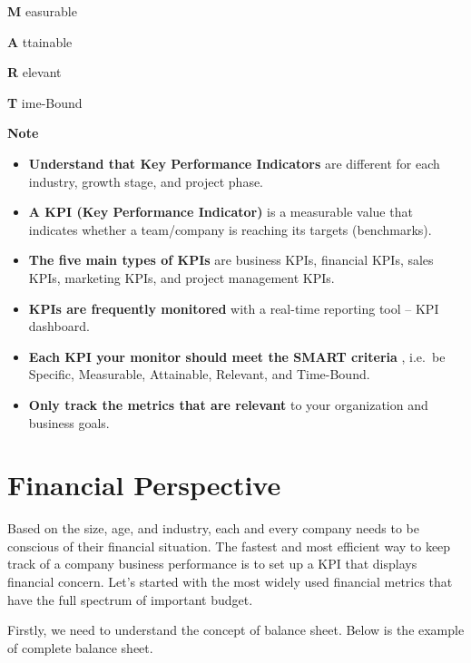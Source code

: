 \documentclass[]{book}
\providecommand{\tightlist}{%
  \setlength{\itemsep}{0pt}\setlength{\parskip}{0pt}}
\begin{document}
\textbf{M }easurable

\textbf{A }ttainable

\textbf{R }elevant

\textbf{T }ime-Bound

\textbf{Note }

\begin{itemize}
\tightlist
\item
  \textbf{Understand that Key Performance Indicators } are different for
  each industry, growth stage, and project phase.
\item
  \textbf{A KPI (Key Performance Indicator) } is a measurable value that
  indicates whether a team/company is reaching its targets (benchmarks).
\item
  \textbf{The five main types of KPIs } are business KPIs, financial
  KPIs, sales KPIs, marketing KPIs, and project management KPIs.
\item
  \textbf{KPIs are frequently monitored } with a real-time reporting
  tool -- KPI dashboard.
\item
  \textbf{Each KPI your monitor should meet the SMART criteria },
  i.e.~be Specific, Measurable, Attainable, Relevant, and Time-Bound.
\item
  \textbf{Only track the metrics that are relevant} to your organization
  and business goals.
\end{itemize}

\section{Financial Perspective}\label{financial-perspective}

Based on the size, age, and industry, each and every company needs to be
conscious of their financial situation. The fastest and most efficient
way to keep track of a company business performance is to set up a KPI
that displays financial concern. Let's started with the most widely used
financial metrics that have the full spectrum of important budget.

Firstly, we need to understand the concept of balance sheet. Below is
the example of complete balance sheet.
\end{document}
